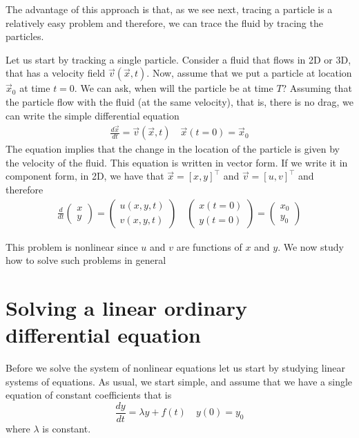 \documentclass[12pt,legal]{article}
\begin{document}
The advantage of this approach is that, as we see next, tracing a particle is a relatively easy problem and therefore, we can trace the fluid by tracing the particles.

Let us start by tracking a single particle.
Consider a fluid that flows in 2D or 3D, that has a velocity field $\vec v(\vec x,t)$.
Now, assume that we put a particle at location $\vec x_0$ at time $t=0$.
We can ask, when will the particle be at time $T$?
Assuming that the particle flow with the fluid (at the same velocity), that is, there is no drag, we can write the simple differential equation
\begin{eqnarray}
\label{simpleEq}
{\frac {d\vec x}{dt}} = \vec v(\vec x,t) \quad \vec x(t=0) = \vec x_0
\end{eqnarray}
The equation implies that the change in the location of the particle is given by the velocity of the fluid.
This equation is written in vector form. If we write it in component form, in 2D, 
we have that $\vec x = [x,y]^{\top}$ and $\vec v = [u,v]^{\top}$ and therefore
\begin{eqnarray}
\label{simpleEqCompForm}
{\frac {d}{dt}} \begin{pmatrix} x \\ y \end{pmatrix}  =
\begin{pmatrix} u(x,y,t) \\ v(x,y,t) \end{pmatrix} 
\quad  \begin{pmatrix} x(t=0) \\ y(t=0) \end{pmatrix} = 
 \begin{pmatrix} x_0 \\ y_0 \end{pmatrix}
\end{eqnarray}

This problem is nonlinear since $u$ and $v$ are functions of $x$ and $y$.
We now study how to solve such problems in general

\section{Solving a linear ordinary differential equation}

Before we solve the system of nonlinear equations let us start by  studying linear systems of equations.
As usual, we start simple, and assume that we have a single equation of constant coefficients that is
$$ {\frac {dy}{dt}} = \lambda y  + f(t) \quad y(0) = y_0$$
where $\lambda$ is constant.
\end{document}
